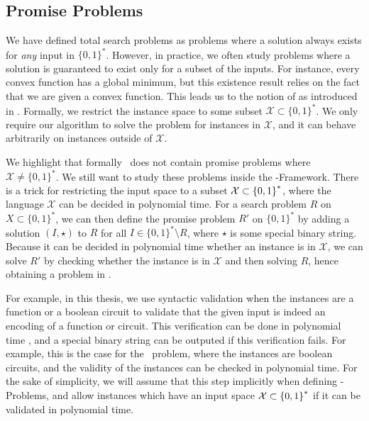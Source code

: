 \subsection{Promise Problems}

We have defined total search problems as problems where a solution always exists for \emph{any} input in $\{0, 1\}^*$. However, in practice, we often study problems where a solution is guaranteed to exist only for a subset of the inputs. For instance, every convex function has a global minimum, but this existence result relies on the fact that we are given a convex function. This leads us to the notion of  as introduced in . Formally, we restrict the instance space to some subset $\mathcal{X} \subset \{0, 1\}^*$. We only require our algorithm to solve the problem for instances in $\mathcal{X}$, and it can behave arbitrarily on instances outside of $\mathcal{X}$.

We highlight that formally \TFNP\ does not contain promise problems where $\mathcal{X} \neq \{0, 1\}^*$. We still want to study these problems inside the \TFNP-Framework. There is a trick for restricting the input space to a subset $\mathcal{X} \subset \left\{0, 1\right\}^*$, where the language $\mathcal{X}$ can be decided in polynomial time. For a search problem $R$ on $X \subset \{0, 1\}^*$, we can then define the promise problem $R'$ on $\{0, 1\}^*$ by adding a solution $(I, \star)$ to $R$ for all $I \in \{0, 1\}^* \setminus R$, where $\star$ is some special binary string. Because it can be decided in polynomial time whether an instance is in $\mathcal{X}$, we can solve $R'$ by checking whether the instance is in $\mathcal{X}$ and then solving $R$, hence obtaining a problem in \TFNP.

For example, in this thesis, we use syntactic validation when the instances are a function or a boolean circuit to validate that the given input is indeed an encoding of a function or circuit. This verification can be done in polynomial time , and a special binary string can be outputed if this verification fails. For example, this is the case for the \Tarski\ problem, where the instances are boolean circuits, and the validity of the instances can be checked in polynomial time. For the sake of simplicity, we will assume that this step implicitly when defining \TFNP-Problems, and allow instances which have an input space $\mathcal{X} \subset \left\{0, 1\right\}^*$ if it can be validated in polynomial time.

